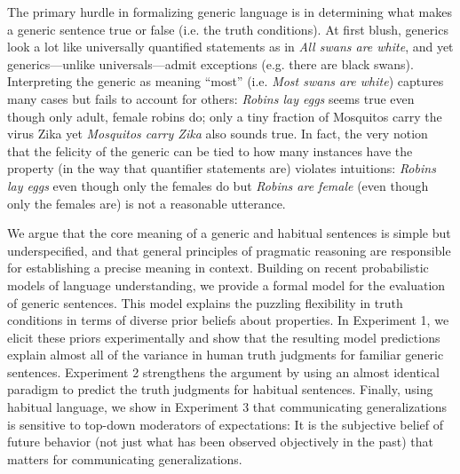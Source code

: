 \documentclass[11pt,letterpaper]{article}
\begin{document}
The primary hurdle in formalizing generic language is in determining what makes a generic sentence true or false (i.e. the truth conditions).
At first blush, generics look a lot like universally quantified statements as in \emph{All swans are white}, and yet generics---unlike universals---admit exceptions (e.g. there are black swans). 
Interpreting the generic as meaning ``most'' (i.e. \emph{Most swans are white}) captures many cases but fails to account for others: \emph{Robins lay eggs} seems true even though only adult, female robins do; only a tiny fraction of Mosquitos carry the virus Zika yet \emph{Mosquitos carry Zika} also sounds true. 
In fact, the very notion that the felicity of the generic can be tied to how many instances have the property (in the way that quantifier statements are) violates intuitions: \emph{Robins lay eggs} even though only the females do but \emph{Robins are female} (even though only the females are) is not a reasonable utterance.


We argue that the core meaning of a generic and habitual sentences is simple but underspecified, and that general principles of pragmatic reasoning are responsible for establishing a precise meaning in context. 
Building on recent probabilistic models of language understanding, we provide a formal model for the evaluation of generic sentences. 
This model explains the puzzling flexibility in truth conditions in terms of diverse prior beliefs about properties.
In Experiment 1, we elicit these priors experimentally and show that the resulting model predictions explain almost all of the variance in human truth judgments for familiar  generic sentences.
Experiment 2 strengthens the argument by using an almost identical paradigm to predict the truth judgments for habitual sentences.
Finally, using habitual language, we show in Experiment 3 that communicating generalizations is sensitive to top-down moderators of expectations: It is the subjective belief of future behavior (not just what has been observed objectively in the past) that matters for communicating generalizations.
\end{document}
